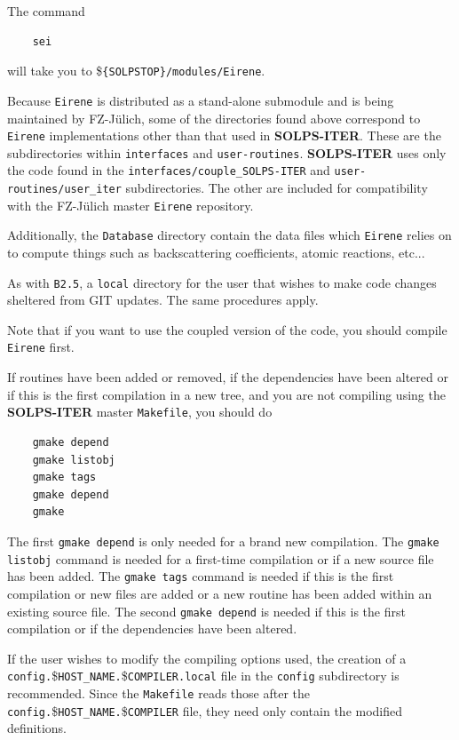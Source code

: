 \documentclass[a4paper,10pt]{report}
\newcommand\SOLPSITER{{\bf SOLPS-ITER} }
\newcommand\SOLPSITERns{{\bf SOLPS-ITER}}
\begin{document}
The command
\begin{verbatim}
    sei
\end{verbatim}
will take you to \${\tt \{SOLPSTOP\}/modules/Eirene}.

Because {\tt Eirene} is distributed as a stand-alone submodule and is being maintained
by FZ-J{\"u}lich, some of the directories found above correspond to {\tt Eirene}
implementations other than that used in \SOLPSITERns. These are the subdirectories
within {\tt interfaces} and {\tt user-routines}. \SOLPSITER uses only the code found in
the {\tt interfaces/couple\_SOLPS-ITER} and {\tt user-routines/user\_iter} subdirectories.
The other are included for compatibility with the FZ-J{\"u}lich master {\tt Eirene}
repository.

Additionally, the {\tt Database} directory contain the data files which {\tt Eirene}
relies on to compute things such as backscattering coefficients, atomic reactions, etc...

As with {\tt B2.5}, a {\tt local} directory for the user that wishes to make code
changes sheltered from GIT updates. The same procedures apply.

Note that if you want to use the coupled version of the code, you
should compile {\tt Eirene} first.

If routines have been added or removed, if the dependencies have been
altered or if this is the first compilation in a new tree, and you are not
compiling using the \SOLPSITER master {\tt Makefile}, you should do
\begin{verbatim}
    gmake depend
    gmake listobj
    gmake tags
    gmake depend
    gmake
\end{verbatim}
The first {\tt gmake depend} is only needed for a brand new compilation.
The {\tt gmake listobj} command is needed for a first-time compilation or if
a new source file has been added.
The {\tt gmake tags} command is needed if this is the first compilation or new
files are added or a new routine has been added within an existing source file.
The second {\tt gmake depend} is needed if this is the first compilation or
if the dependencies have been altered.

If the user wishes to modify the compiling options used, the creation
of a {\tt config.}\${\tt {HOST\_NAME}.}\${\tt {COMPILER}.local} file in the
{\tt config} subdirectory is recommended. Since the {\tt Makefile}
reads those after the {\tt config.}\${\tt {HOST\_NAME}.\allowbreak}\${\tt {COMPILER}} file,
they need only contain the modified definitions.
\end{document}
